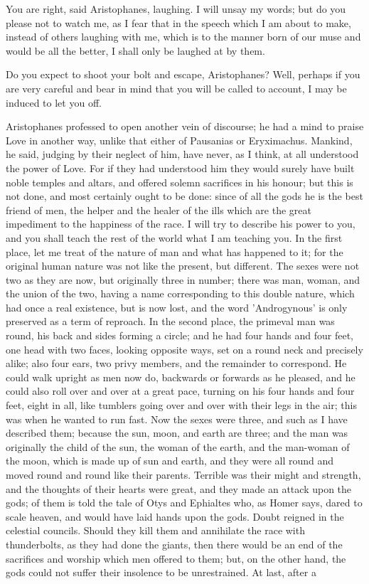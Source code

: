 \documentclass[11pt,letter]{article}
\begin{document}
\par  You are right, said Aristophanes, laughing. I will unsay my words; but do you please not to watch me, as I fear that in the speech which I am about to make, instead of others laughing with me, which is to the manner born of our muse and would be all the better, I shall only be laughed at by them.

\par  Do you expect to shoot your bolt and escape, Aristophanes? Well, perhaps if you are very careful and bear in mind that you will be called to account, I may be induced to let you off.

\par  Aristophanes professed to open another vein of discourse; he had a mind to praise Love in another way, unlike that either of Pausanias or Eryximachus. Mankind, he said, judging by their neglect of him, have never, as I think, at all understood the power of Love. For if they had understood him they would surely have built noble temples and altars, and offered solemn sacrifices in his honour; but this is not done, and most certainly ought to be done: since of all the gods he is the best friend of men, the helper and the healer of the ills which are the great impediment to the happiness of the race. I will try to describe his power to you, and you shall teach the rest of the world what I am teaching you. In the first place, let me treat of the nature of man and what has happened to it; for the original human nature was not like the present, but different. The sexes were not two as they are now, but originally three in number; there was man, woman, and the union of the two, having a name corresponding to this double nature, which had once a real existence, but is now lost, and the word 'Androgynous' is only preserved as a term of reproach. In the second place, the primeval man was round, his back and sides forming a circle; and he had four hands and four feet, one head with two faces, looking opposite ways, set on a round neck and precisely alike; also four ears, two privy members, and the remainder to correspond. He could walk upright as men now do, backwards or forwards as he pleased, and he could also roll over and over at a great pace, turning on his four hands and four feet, eight in all, like tumblers going over and over with their legs in the air; this was when he wanted to run fast. Now the sexes were three, and such as I have described them; because the sun, moon, and earth are three; and the man was originally the child of the sun, the woman of the earth, and the man-woman of the moon, which is made up of sun and earth, and they were all round and moved round and round like their parents. Terrible was their might and strength, and the thoughts of their hearts were great, and they made an attack upon the gods; of them is told the tale of Otys and Ephialtes who, as Homer says, dared to scale heaven, and would have laid hands upon the gods. Doubt reigned in the celestial councils. Should they kill them and annihilate the race with thunderbolts, as they had done the giants, then there would be an end of the sacrifices and worship which men offered to them; but, on the other hand, the gods could not suffer their insolence to be unrestrained. At last, after a 
\end{document}
